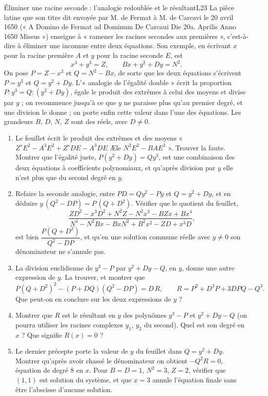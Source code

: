 \documentclass[11pt,a4paper]{article}
\begin{document}
\begin{exercice}{Éliminer une racine seconde : l'analogie redoublée et le résultant}{L2}{3}
La pièce latine que son titre dit envoyée par M. de Fermat à M. de Carcavi le
20 avril 1650 (« A Domino de Fermat ad Dominum De Carcaui Die 20a. Aprilis Anno
1650 Missus ») enseigne à « ramener les racines secondes aux premières »,
c'est-à-dire à éliminer une inconnue entre deux équations. Son exemple, en
écrivant $x$ pour la racine première $A$ et $y$ pour la racine seconde $E$, est
\[ x^3 + y^3 = Z, \qquad Bx + y^2 + Dy = N^2 . \]
On pose $P = Z - x^3$ et $Q = N^2 - Bx$, de sorte que les deux équations
s'écrivent $P = y^3$ et $Q = y^2 + Dy$. L'« analogie de l'égalité double » écrit
la proportion $P : y^3 = Q : (y^2 + Dy)$, égale le produit des extrêmes à celui
des moyens et divise par $y$ ; on recommence jusqu'à ce que $y$ ne paraisse plus
qu'au premier degré, et une division le donne ; on porte enfin cette valeur dans
l'une des équations. Les grandeurs $B$, $D$, $N$, $Z$ sont des réels, avec
$D \neq 0$.
\begin{enumerate}
\item Le feuillet écrit le produit des extrêmes et des moyens
  « $Z^sE^2 - A^3E^2 + Z^sDE - A^3DE$ Æle $N^2E^2 - BAE^3$ ». Trouver la faute.
  Montrer que l'égalité juste, $P(y^2 + Dy) = Qy^3$, est une combinaison des
  deux équations à coefficients polynomiaux, et qu'après division par $y$ elle
  n'est plus que du second degré en $y$.
\item Refaire la seconde analogie, entre $PD = Qy^2 - Py$ et $Q = y^2 + Dy$, et
  en déduire $y\,(Q^2 - DP) = P\,(Q + D^2)$. Vérifier que le quotient du
  feuillet,
  \[ \frac{ZD^2 - x^3D^2 + N^2Z - N^2x^3 - BZx + Bx^4}
          {N^4 - N^2Bx - BxN^2 + B^2x^2 - ZD + x^3D} , \]
  est bien $\dfrac{P(Q + D^2)}{Q^2 - DP}$, et qu'en une solution commune réelle
  avec $y \neq 0$ son dénominateur ne s'annule pas.
\item La division euclidienne de $y^3 - P$ par $y^2 + Dy - Q$, en $y$, donne
  une autre expression de $y$. La trouver, et montrer que
  \[ P(Q + D^2)^2 - (P + DQ)(Q^2 - DP) = D\,R, \qquad
     R = P^2 + D^3P + 3DPQ - Q^3 . \]
  Que peut-on en conclure sur les deux expressions de $y$ ?
\item Montrer que $R$ est le résultant en $y$ des polynômes $y^3 - P$ et
  $y^2 + Dy - Q$ (on pourra utiliser les racines complexes $y_1$, $y_2$ du
  second). Quel est son degré en $x$ ? Que signifie $R(x) = 0$ ?
\item Le dernier précepte porte la valeur de $y$ du feuillet dans
  $Q = y^2 + Dy$. Montrer qu'après avoir chassé le dénominateur on obtient
  $-Q^2R = 0$, équation de degré 8 en $x$. Pour $B = D = 1$, $N^2 = 3$, $Z = 2$,
  vérifier que $(1, 1)$ est solution du système, et que $x = 3$ annule
  l'équation finale sans être l'abscisse d'aucune solution.
\end{enumerate}
\end{exercice}
\end{document}
